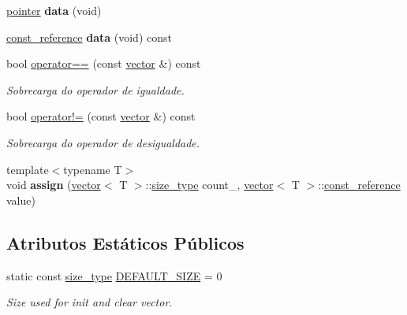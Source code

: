\begin{DoxyCompactItemize}
\hyperlink{classsc_1_1vector_a0348a6e1e249e051964a2bc94b05527a}{pointer} {\bfseries data} (void)
\item 
\mbox{\label{classsc_1_1vector_a91112807482b4d0f6e13096063263eb5}} 
\hyperlink{classsc_1_1vector_a8da2b1a11b069241100f9b2e14f481a0}{const\+\_\+reference} {\bfseries data} (void) const
\item 
\mbox{\label{classsc_1_1vector_a14470a2d43b26c15f0f7aaeeb6ae4f04}} 
bool \hyperlink{classsc_1_1vector_a14470a2d43b26c15f0f7aaeeb6ae4f04}{operator==} (const \hyperlink{classsc_1_1vector}{vector} \&) const
\begin{DoxyCompactList}\small\item\em Sobrecarga do operador de igualdade. \end{DoxyCompactList}\item 
\mbox{\label{classsc_1_1vector_a9cf88e668b52a2a00961378d60812064}} 
bool \hyperlink{classsc_1_1vector_a9cf88e668b52a2a00961378d60812064}{operator!=} (const \hyperlink{classsc_1_1vector}{vector} \&) const
\begin{DoxyCompactList}\small\item\em Sobrecarga do operador de desigualdade. \end{DoxyCompactList}\item 
\mbox{\label{classsc_1_1vector_a67d141f57f019a2ad15fa39b90369910}} 
{\footnotesize template$<$typename T$>$ }\\void {\bfseries assign} (\hyperlink{classsc_1_1vector}{vector}$<$ T $>$\+::\hyperlink{classsc_1_1vector_a48bf37ba1a6d0c13504414d86e27c399}{size\+\_\+type} count\+\_\+, \hyperlink{classsc_1_1vector}{vector}$<$ T $>$\+::\hyperlink{classsc_1_1vector_a8da2b1a11b069241100f9b2e14f481a0}{const\+\_\+reference} value)
\end{DoxyCompactItemize}
\subsection*{Atributos Estáticos Públicos}
\begin{DoxyCompactItemize}
\item 
\mbox{\label{classsc_1_1vector_a287b97d30cd9f7540da7d5ef628e49a7}} 
static const \hyperlink{classsc_1_1vector_a48bf37ba1a6d0c13504414d86e27c399}{size\+\_\+type} \hyperlink{classsc_1_1vector_a287b97d30cd9f7540da7d5ef628e49a7}{D\+E\+F\+A\+U\+L\+T\+\_\+\+S\+I\+ZE} = 0
\begin{DoxyCompactList}\small\item\em Size used for init and clear vector. \end{DoxyCompactList}\end{DoxyCompactItemize}
